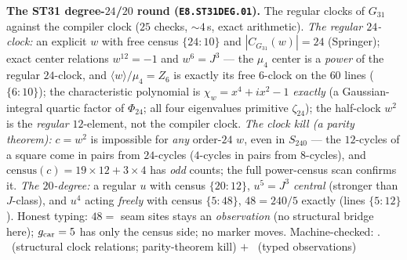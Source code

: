 
\par\smallskip\noindent\textbf{The ST31 degree-$24$/$20$ round
(\texttt{E8.ST31DEG.01}).}
The regular clocks of $G_{31}$ against the compiler clock ($25$
checks, ${\sim}4$\,s, exact arithmetic).  \emph{The regular
$24$-clock:} an explicit $w$ with free census $\{24{:}10\}$ and
$|C_{G_{31}}(w)|=24$ (Springer); exact center relations $w^{12}=-1$
and $w^6=J^3$ --- the $\mu_4$ center is a \emph{power} of the regular
$24$-clock, and $\langle w\rangle/\mu_4=Z_6$ is exactly its free
$6$-clock on the $60$ lines ($\{6{:}10\}$); the characteristic
polynomial is $\chi_w=x^4+ix^2-1$ \emph{exactly} (a Gaussian-integral
quartic factor of $\Phi_{24}$; all four eigenvalues primitive
$\zeta_{24}$); the half-clock $w^2$ is the \emph{regular} $12$-element,
not the compiler clock.  \emph{The clock kill (a parity theorem):}
$c=w^2$ is impossible for \emph{any} order-$24$ $w$, even in
$S_{240}$ --- the $12$-cycles of a square come in pairs from
$24$-cycles ($4$-cycles in pairs from $8$-cycles), and
$\mathrm{census}(c)=19{\times}12+3{\times}4$ has \emph{odd} counts;
the full power-census scan confirms it.  \emph{The $20$-degree:} a
regular $u$ with census $\{20{:}12\}$, $u^5=J^3$ \emph{central}
(stronger than $J$-class), and $u^4$ acting \emph{freely} with census
$\{5{:}48\}$, $48=240/5$ exactly (lines $\{5{:}12\}$).  Honest typing:
$48=$ seam sites stays an \emph{observation} (no structural bridge
here); $g_{\mathrm{car}}=5$ has only the census side; no marker moves.
Machine-checked: .
\mE\ (structural clock relations; parity-theorem kill) $+$ \mC\
(typed observations)
\par\smallskip

